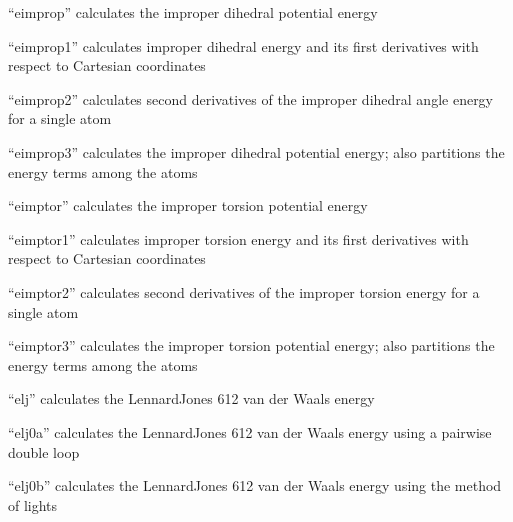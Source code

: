 \documentclass[letterpaper,11pt,english]{sphinxmanual}
\begin{document}





“eimprop” calculates the improper dihedral potential energy


“eimprop1” calculates improper dihedral energy and its
first derivatives with respect to Cartesian coordinates


“eimprop2” calculates second derivatives of the improper
dihedral angle energy for a single atom


“eimprop3” calculates the improper dihedral potential
energy; also partitions the energy terms among the atoms


“eimptor” calculates the improper torsion potential energy


“eimptor1” calculates improper torsion energy and its
first derivatives with respect to Cartesian coordinates


“eimptor2” calculates second derivatives of the improper
torsion energy for a single atom


“eimptor3” calculates the improper torsion potential energy;
also partitions the energy terms among the atoms


“elj” calculates the Lennard\sphinxhyphen{}Jones 6\sphinxhyphen{}12 van der Waals energy


“elj0a” calculates the Lennard\sphinxhyphen{}Jones 6\sphinxhyphen{}12 van der Waals energy
using a pairwise double loop


“elj0b” calculates the Lennard\sphinxhyphen{}Jones 6\sphinxhyphen{}12 van der Waals energy
using the method of lights
\end{document}
